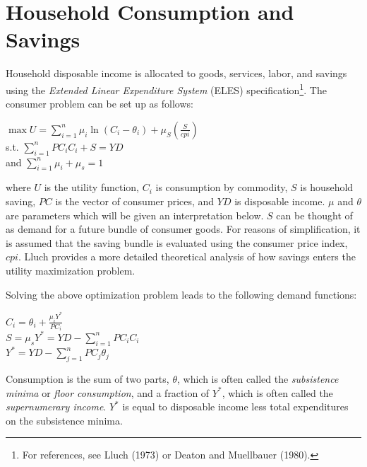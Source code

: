 \documentclass{article}
\begin{document}
\section{Household Consumption and Savings}

Household disposable income is allocated to goods, services, labor, and savings using the \textit{Extended Linear Expenditure System} (ELES) specification\footnote{For references, see Lluch (1973) or Deaton and Muellbauer (1980).}. The consumer problem can be set up as follows:

\begin{center}

$\max U = \displaystyle \sum_{i=1}^n\mu_i\ln(C_i - \theta_i) + \mu_S\left(\frac{S}{cpi}\right)$\\
s.t. $\displaystyle \sum_{i=1}^n PC_iC_i + S = YD$\\
and $\sum_{i=1}^n\mu_i + \mu_s = 1$

\end{center}

where $U$ is the utility function, $C_i$ is consumption by commodity, $S$ is household saving, $PC$ is the vector of consumer prices, and $YD$ is disposable income. $\mu$ and $\theta$ are parameters which will be given an interpretation below. $S$ can be thought of as demand for a future bundle of consumer goods. For reasons of simplification, it is assumed that the saving bundle is evaluated using the consumer price index, $cpi$. Lluch provides a more detailed theoretical analysis of how savings enters the utility maximization problem.

Solving the above optimization problem leads to the following demand functions:
\begin{center}

$C_i = \theta_i + \frac{\mu_iY^*}{PC_i}$\\
$S = \mu_sY^* = YD - \displaystyle \sum_{i=1}^nPC_iC_i$\\
$Y^* = YD - \displaystyle \sum_{j=1}^nPC_j\theta_j$

\end{center}

Consumption is the sum of two parts, $\theta$, which is often called the \textit{subsistence minima} or \textit{floor consumption}, and a fraction of $Y^*$, which is often called the \textit{supernumerary income}. $Y^*$ is equal to disposable income less total expenditures on the subsistence minima.
\end{document}
